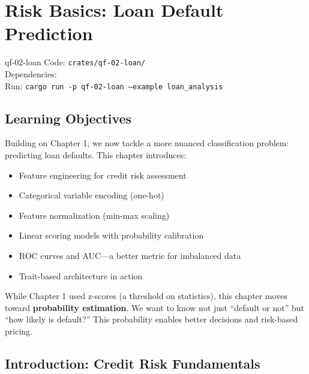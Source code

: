 \chapter{Risk Basics: Loan Default Prediction}
\label{ch:loan}

\begin{companioncode}{qf-02-loan}
Code: \texttt{crates/qf-02-loan/}\\
Dependencies: \\
Run: \texttt{cargo run -p qf-02-loan --example loan\_analysis}
\end{companioncode}

\section{Learning Objectives}

Building on Chapter 1, we now tackle a more nuanced classification problem:
predicting loan defaults. This chapter introduces:

\begin{itemize}
    \item Feature engineering for credit risk assessment
    \item Categorical variable encoding (one-hot)
    \item Feature normalization (min-max scaling)
    \item Linear scoring models with probability calibration
    \item ROC curves and AUC---a better metric for imbalanced data
    \item Trait-based architecture in action
\end{itemize}

\begin{keyinsight}
While Chapter 1 used z-scores (a threshold on statistics), this chapter moves
toward \textbf{probability estimation}. We want to know not just ``default or
not'' but ``how likely is default?'' This probability enables better decisions
and risk-based pricing.
\end{keyinsight}

\section{Introduction: Credit Risk Fundamentals}


